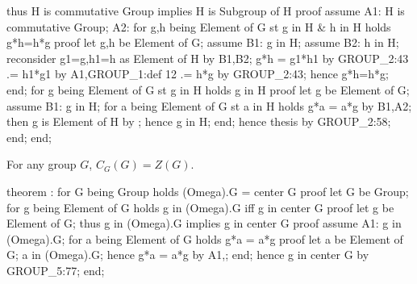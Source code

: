   thus H is commutative Group implies H is Subgroup of  H
  proof
    assume A1: H is commutative Group;
    A2: for g,h being Element of G st g in H & h in H holds g*h=h*g
    proof
      let g,h be Element of G;
      assume B1: g in H;
      assume B2: h in H;
      reconsider g1=g,h1=h as Element of H by B1,B2;
      g*h = g1*h1 by GROUP_2:43
         .= h1*g1 by A1,GROUP_1:def 12
         .= h*g by GROUP_2:43;
      hence g*h=h*g;
    end;
    for g being Element of G st g in H holds g in  H
    proof
      let g be Element of G;
      assume B1: g in H;
      for a being Element of G st a in H holds g*a = a*g by B1,A2;
      then g is Element of  H by ;
      hence g in  H;
    end;
    hence thesis by GROUP_2:58;
  end;
end;
\eatline
{}\nwendcode{}\nwdocspar
\begin{theorem}
For any group $G$, $C_{G}(G)=Z(G)$.
\end{theorem}

\nwenddocs{}\endmoddef\nwstartdeflinemarkup{}\nwenddeflinemarkup
theorem :
  for G being Group
  holds  (Omega).G = center G
proof
  let G be Group;
  for g being Element of G holds g in  (Omega).G iff g in center G
  proof
    let g be Element of G;
    thus g in  (Omega).G implies g in center G
    proof
      assume A1: g in  (Omega).G;
      for a being Element of G holds g*a = a*g
      proof
        let a be Element of G;
        a in (Omega).G;
        hence g*a = a*g by A1,;
      end;
      hence g in center G by GROUP_5:77;
    end;


